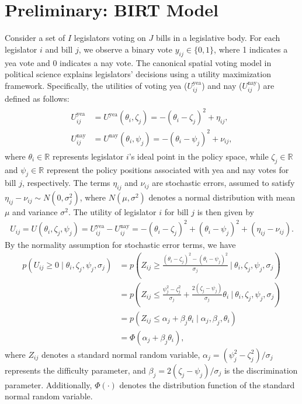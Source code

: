 \documentclass[11pt]{article}
\begin{document}
\section{Preliminary: BIRT Model} \label{sec_2}
Consider a set of $ I $ legislators voting on $ J $ bills in a legislative body. For each legislator $ i $ and bill $ j $, we observe a binary vote $ y_{ij} \in \{0,1\} $, where 1 indicates a yea vote and 0 indicates a nay vote. The canonical spatial voting model in political science \cite[e.g.][]{Poole1997, Clinton2004, Royce2013} explains legislators' decisions using a utility maximization framework.
Specifically, the utilities of voting yea ($ U_{ij}^{\text{yea}} $) and nay ($ U_{ij}^{\text{nay}} $) are defined as follows:
\begin{align}\label{eqn:utility_yea_nay}
\begin{split}
    U_{ij}^{\text{yea}} &= U^{\text{yea}}(\theta_i, \zeta_j) = -(\theta_i - \zeta_j)^2 + \eta_{ij},\\
    U_{ij}^{\text{nay}} &= U^{\text{nay}}(\theta_i, \psi_j) = -(\theta_i - \psi_j)^2 + \nu_{ij},
\end{split}
\end{align}  
where $ \theta_i \in \mathbb{R} $ represents legislator $ i $'s ideal point in the policy space, while $ \zeta_j \in \mathbb{R}$ and $ \psi_j \in \mathbb{R}$ represent the policy positions associated with yea and nay votes for bill $ j $, respectively. The terms $ \eta_{ij} $ and $ \nu_{ij} $ are stochastic errors, assumed to satisfy $ \eta_{ij} - \nu_{ij} \sim N(0, \sigma_j^2) $, where $ N(\mu, \sigma^2) $ denotes a normal distribution with mean $ \mu $ and variance $ \sigma^2 $.   
The utility of legislator $i$ for bill $j$ is then given by  
\begin{align}\label{eqn:utility_ij}
    U_{ij} = U(\theta_i, \zeta_j, \psi_j)  = U_{ij}^{\text{yea}} - U_{ij}^{\text{nay}} = -(\theta_i - \zeta_j)^2 + (\theta_i - \psi_j)^2 + (\eta_{ij} - \nu_{ij}).
\end{align}  
By the normality assumption for stochastic error terms, we have
\begin{align*}
    p(U_{ij} \geq 0 \mid \theta_i, \zeta_j, \psi_j, \sigma_j) 
    &= p\left(Z_{ij} \geq \frac{(\theta_i - \zeta_j)^2 - (\theta_i - \psi_j)^2}{\sigma_j} ~\Bigg|~ \theta_i, \zeta_j, \psi_j, \sigma_j\right)\\
    &= p\left(Z_{ij} \leq  \frac{\psi_j^2 - \zeta_j^2}{\sigma_j} + \frac{2(\zeta_j - \psi_j)}{\sigma_j}  \theta_i ~\Bigg |~ \theta_i, \zeta_j, \psi_j, \sigma_j\right)\\
    &= p(Z_{ij} \leq \alpha_j + \beta_j  \theta_i \mid \alpha_j, \beta_j, \theta_i)\\
    &= \Phi(\alpha_j + \beta_j \theta_i),
\end{align*}  
where $ Z_{ij} $ denotes a standard normal random variable, $ \alpha_j = (\psi_j^2 - \zeta_j^2)/\sigma_j $ represents the difficulty parameter, and $ \beta_j = 2(\zeta_j - \psi_j)/\sigma_j $ is the discrimination parameter. Additionally, $\Phi(\cdot)$ denotes the distribution function of the standard normal random variable. 
\end{document}
